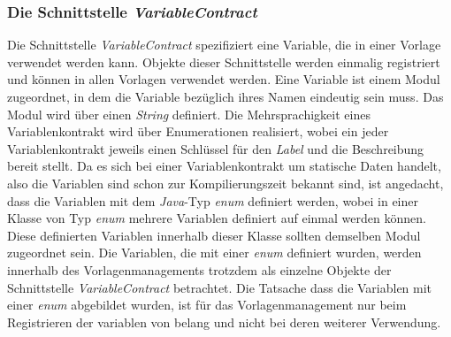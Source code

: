 \subsubsection{Die Schnittstelle \emph{VariableContract}}
\label{sec:variableContract}
Die Schnittstelle \emph{VariableContract} spezifiziert eine Variable, die in einer Vorlage verwendet werden kann. Objekte dieser Schnittstelle werden einmalig registriert und können in allen Vorlagen verwendet werden. Eine Variable ist einem Modul zugeordnet, in dem die Variable bezüglich ihres Namen eindeutig sein muss. Das Modul wird über einen \emph{String} definiert. Die Mehrsprachigkeit eines Variablenkontrakt wird über Enumerationen realisiert, wobei ein jeder Variablenkontrakt jeweils einen Schlüssel für den \emph{Label} und die Beschreibung bereit stellt. 
\newline
\newline
Da es sich bei einer Variablenkontrakt um statische Daten handelt, also die Variablen sind schon zur Kompilierungszeit bekannt sind, ist angedacht, dass die Variablen mit dem \emph{Java}-Typ \emph{enum} definiert werden, wobei in einer Klasse von Typ \emph{enum} mehrere Variablen definiert auf einmal werden können. Diese definierten Variablen innerhalb dieser Klasse sollten demselben Modul zugeordnet sein. Die Variablen, die mit einer \emph{enum} definiert wurden, werden innerhalb des Vorlagenmanagements trotzdem als einzelne Objekte der Schnittstelle \emph{VariableContract} betrachtet. Die Tatsache dass die Variablen mit einer \emph{enum} abgebildet wurden, ist für das Vorlagenmanagement nur beim Registrieren der variablen von belang und nicht bei deren weiterer Verwendung.
\newpage

